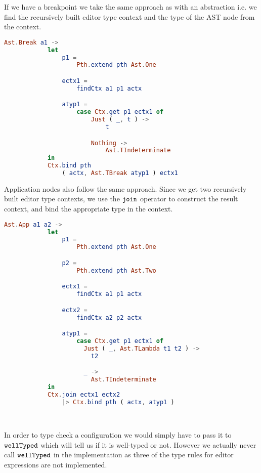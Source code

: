 If we have a breakpoint we take the same approach as with an abstraction i.e.
we find the recursively built editor type context and the type of the AST node
from the context.
\begin{lstlisting}[language=elm,%
                   gobble=8,%
                   ]
        Ast.Break a1 ->
            let
                p1 =
                    Pth.extend pth Ast.One

                ectx1 =
                    findCtx a1 p1 actx

                atyp1 =
                    case Ctx.get p1 ectx1 of
                        Just ( _, t ) ->
                            t

                        Nothing ->
                            Ast.TIndeterminate
            in
            Ctx.bind pth
                ( actx, Ast.TBreak atyp1 ) ectx1
\end{lstlisting}
Application nodes also follow the same approach. Since we get two recursively
built editor type contexts, we use the $\texttt{join}$ operator to construct the
result context, and bind the appropriate type in the context.
\begin{lstlisting}[language=elm,%
                   gobble=8,%
                   ]
        Ast.App a1 a2 ->
            let
                p1 =
                    Pth.extend pth Ast.One

                p2 =
                    Pth.extend pth Ast.Two

                ectx1 =
                    findCtx a1 p1 actx

                ectx2 =
                    findCtx a2 p2 actx

                atyp1 =
                    case Ctx.get p1 ectx1 of
                      Just ( _, Ast.TLambda t1 t2 ) ->
                        t2

                      _ ->
                        Ast.TIndeterminate
            in
            Ctx.join ectx1 ectx2
                |> Ctx.bind pth ( actx, atyp1 )
\end{lstlisting}
~

In order to type check a configuration we would simply have to pass it to
$\texttt{wellTyped}$ which will tell us if it is well-typed or not. However we
actually never call $\texttt{wellTyped}$ in the implementation as three of the
type rules for editor expressions are not implemented.

